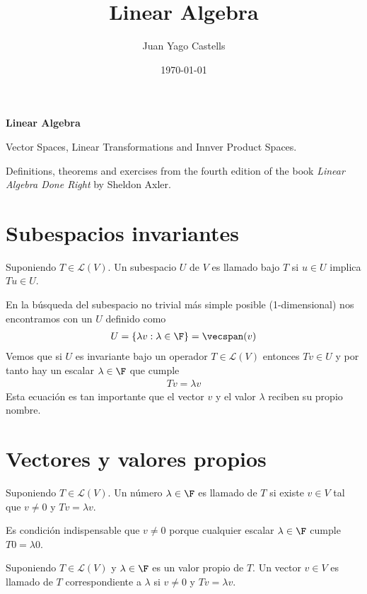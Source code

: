\documentclass{scrartcl}
\title{Linear Algebra}
\author{Juan Yago Castells}
\date{\today}
\begin{document}
\textbf{\Large Linear Algebra}
\vspace*{0.5cm}

Vector Spaces, Linear Transformations and Innver Product Spaces.

Definitions, theorems and exercises from the fourth edition of the book
\textit{Linear Algebra Done Right} by Sheldon Axler.

\section{Subespacios invariantes}%

\begin{definition}
Suponiendo $T \in \mathcal{L}(V)$. Un subespacio $U$ de $V$ es llamado  bajo $T$ si $u \in U$ implica $Tu \in U$.
\end{definition}
En la búsqueda del subespacio no trivial más simple posible (1-dimensional) nos encontramos con un $U$ definido como
\begin{align*}
  U = \{ \lambda v : \lambda \in \F \} = \vecspan(v)
\end{align*}
Vemos que si $U$ es invariante bajo un operador $T\in \mathcal{L}(V)$ entonces $Tv \in U$ y por tanto hay un escalar $\lambda \in \F$ que cumple
\begin{align*}
  Tv = \lambda v
\end{align*}
Esta ecuación es tan importante que el vector $v$ y el valor $\lambda$ reciben su propio nombre.

\section{Vectores y valores propios}

\begin{definition}
  Suponiendo $T \in \mathcal{L}(V)$. Un número $\lambda \in \F$ es llamado  de $T$ si existe $v \in V$ tal que $v \neq 0$ y $Tv = \lambda v$.
\end{definition}

Es condición indispensable que $v \neq 0$ porque cualquier escalar $\lambda \in \F$ cumple $T0 = \lambda 0$.

\begin{definition}
  Suponiendo $T \in \mathcal{L}(V)$ y $\lambda \in \F$ es un valor propio de $T$. Un vector $v \in V$ es llamado  de $T$ correspondiente a $\lambda$ si $v \neq 0$ y $Tv = \lambda v$.
\end{definition}
\end{document}

